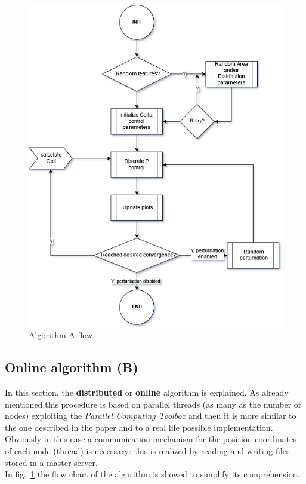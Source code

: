 \documentclass[a4paper,11pt,oneside]{book}
\begin{document}
	\begin{figure} [H]
		
		\centering
		
		\includegraphics[scale=0.63]{figs/algorithmA.png}
		
		\caption{Algorithm A flow}\label{fig:algorithmA.png}
		
	\end{figure}
	
\subsection{Online algorithm (B)}
	
In this section, the \textbf{distributed} or \textbf{online} algorithm is explained. As already mentioned,this procedure is based on parallel threads (as many as the number of nodes) exploiting the \textit{Parallel Computing Toolbox} and then it is more similar to the one described in the paper \cite{K1} and to a real life possible implementation. Obviously in this case a communication mechanism for the position coordinates of each node (thread) is necessary: this is realized by reading and writing files stored in a master server.\\
In fig.~\ref{fig:algorithmA.png} the flow chart of the algorithm is showed to simplify its comprehension.\\
\end{document}

